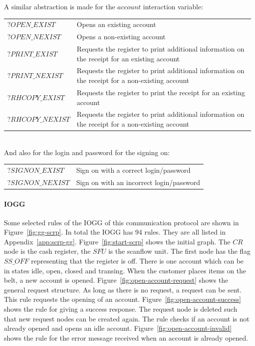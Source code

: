 A similar abstraction is made for the $\mathit{account}$ interaction variable: 
\vspace{5px}\\
\begin{tabular}{lp{310px}}
$\mathit{?OPEN\_EXIST}$ & Opens an existing account \\
$\mathit{?OPEN\_NEXIST}$ & Opens a non-existing account \\
$\mathit{?PRINT\_EXIST}$ & Requests the register to print additional information on the receipt for an existing account \\
$\mathit{?PRINT\_NEXIST}$ & Requests the register to print additional information on the receipt for a non-existing account \\
$\mathit{?RHCOPY\_EXIST}$ & Requests the register to print the receipt for an existing account \\
$\mathit{?RHCOPY\_NEXIST}$ & Requests the register to print additional information on the receipt for a non-existing account \\
\end{tabular}
\vspace{5px} \\
And also for the login and password for the signing on: 
\vspace{5px}\\
\begin{tabular}{ll}
$\mathit{?SIGNON\_EXIST}$ & Sign on with a correct login/password \\
$\mathit{?SIGNON\_NEXIST}$ & Sign on with an incorrect login/password \\
\end{tabular}

\paragraph*{IOGG} Some selected rules of the IOGG of this communication protocol are shown in Figure~\ref{fig:gg-scrp}. In total the IOGG has 94 rules. They are all listed in Appendix~\ref{app:scrp-gg}. Figure~\ref{fig:start-scrp} shows the initial graph. The $CR$ node is the cash register, the $SFU$ is the scanflow unit. The first node has the flag $\mathit{SS\_OFF}$ representing that the register is off. There is one account which can be in states idle, open, closed and transing. When the customer places items on the belt, a new account is opened. Figure~\ref{fig:open-account-request} shows the general request structure. As long as there is no request, a request can be sent. This rule requests the opening of an account. Figure~\ref{fig:open-account-success} shows the rule for giving a success response. The request node is deleted such that new request nodes can be created again. The rule checks if an account is not already opened and opens an idle account. Figure~\ref{fig:open-account-invalid} shows the rule for the error message received when an account is already opened. 

